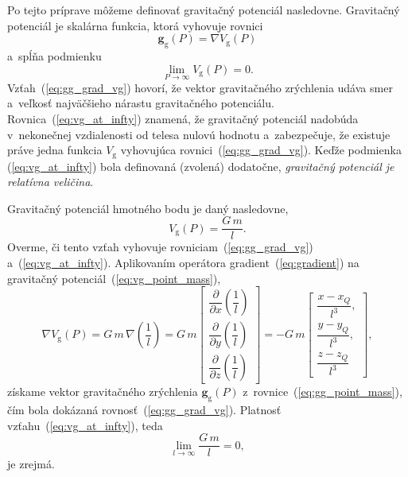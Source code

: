 \documentclass[a4paper, 12pt]{book}
\newcommand{\gidx}{\mathrm g}
\let\vec\mathbf
\begin{document}
Po tejto príprave môžeme definovať gravitačný potenciál nasledovne.  Gravitačný 
potenciál je skalárna funkcia, ktorá vyhovuje rovnici 
\citep{SansoGeoidDetermination}
%
\begin{equation}
\label{eq:gg_grad_vg}
\vec g_\gidx(P) = \nabla V_\gidx(P)
\end{equation}
%
a~spĺňa podmienku
%
\begin{equation}
\label{eq:vg_at_infty}
\lim_{P \to \infty} V_\gidx(P) = 0{.}
\end{equation}
%
Vzťah~(\ref{eq:gg_grad_vg}) hovorí, že vektor gravitačného zrýchlenia udáva 
smer a~veľkosť najväčšieho nárastu gravitačného potenciálu.  
Rovnica~(\ref{eq:vg_at_infty}) znamená, že gravitačný potenciál nadobúda 
v~nekonečnej vzdialenosti od telesa nulovú hodnotu a~zabezpečuje, že existuje 
práve jedna funkcia $V_\gidx$ vyhovujúca rovnici~(\ref{eq:gg_grad_vg}).  Keďže 
podmienka (\ref{eq:vg_at_infty}) bola definovaná (zvolená) dodatočne, 
\emph{gravitačný potenciál je relatívna veličina}.

Gravitačný potenciál hmotného bodu je daný nasledovne,
%
\begin{equation}
\label{eq:vg_point_mass}
V_\gidx(P) = \frac{G \, m}{l}{.}
\end{equation}
%
Overme, či tento vzťah vyhovuje rovniciam~(\ref{eq:gg_grad_vg}) 
a~(\ref{eq:vg_at_infty}).  Aplikovaním operátora gradient~(\ref{eq:gradient}) 
na gravitačný potenciál~(\ref{eq:vg_point_mass}),
%
\begin{equation}
\label{eq:gg_from_vg_point_mass}
\nabla V_\gidx(P) = G \, m \, \nabla \left( \frac{1}{l} \right) =
%
G \, m
\begin{bmatrix}
\dfrac{\partial}{\partial x} \left( \dfrac{1}{l} \right)\\[2ex]
\dfrac{\partial}{\partial y} \left( \dfrac{1}{l} \right)\\[2ex]
\dfrac{\partial}{\partial z} \left( \dfrac{1}{l} \right)
\end{bmatrix}
%
=
%
-G \, m
%
\begin{bmatrix}
\dfrac{x - x_Q}{l^3}{,}\\[2ex]
\dfrac{y - y_Q}{l^3}{,}\\[2ex]
\dfrac{z - z_Q}{l^3}
\end{bmatrix}
{,}
\end{equation}
%
získame vektor gravitačného zrýchlenia $\vec g_\gidx(P)$ 
z~rovnice~(\ref{eq:gg_point_mass}), čím bola dokázaná 
rovnosť~(\ref{eq:gg_grad_vg}).  Platnosť vzťahu~(\ref{eq:vg_at_infty}), teda
%
\begin{equation}
\lim_{l \to \infty} \frac{G \, m}{l} = 0{,}
\end{equation}
%
je zrejmá.
\end{document}
